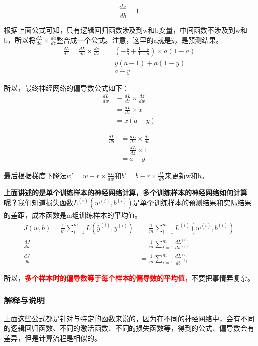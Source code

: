 \begin{equation}
	\frac{dz}{db} = 1 \label{eq:derivative_logistic_db}
\end{equation}

根据上面公式可知，只有逻辑回归函数涉及到w和b变量，中间函数不涉及到w和b，所以将$\frac{dL}{da} \times \frac{da}{dz}$整合成一个公式。注意，这里的a就是$\hat{y}$，是预测结果。
\begin{align*}
	\frac{dL}{dz} = \frac{dL}{da} \times \frac{da}{dz}  &= (-\frac{y}{a} + \frac{1 - y}{1 - a}) \times a(1 	- a) \\
	      																		&= y(a - 1) + a(1 - y) \\
	      																		&= a - y
\end{align*}

所以，最终神经网络的偏导数公式如下：
\begin{align*}
	\frac{dL}{dw} &= \frac{dL}{dz} \times \frac{dz}{dw} \\
						 &= \frac{dL}{dz} \times x \\
						 &= x(a-y)
\end{align*}

\begin{align*}
	\frac{dL}{db} &= \frac{dL}{dz} \times \frac{dz}{db} \\
						 &= \frac{dL}{dz} \times 1 \\
						 &= a-y
\end{align*}

最后根据梯度下降法$w' = w - r \times \frac{dL}{dw}$和$b' = b - r \times \frac{dL}{db}$来更新w和b。

\textbf{上面讲述的是单个训练样本的神经网络计算，多个训练样本的神经网络如何计算呢？}我们知道损失函数$L^{(i)}(w^{(i)},b^{(i)})$是单个训练样本的预测结果和实际结果的差距，成本函数是m组训练样本的平均值。
\begin{align*}
	J(w,b) = \frac{1}{m}\sum_{i=1}^{m}L(\hat{y}^{(i)}, y^{(i)}) &= \frac{1}{m}\sum_{i=1}^{m}L^{(i)}(w^{(i)},b^{(i)}) \\
	\frac{dJ}{dw} &= \frac{1}{m}\sum_{i=1}^{m}\frac{dL^{(i)}}{dw^{(i)}} \\
	\frac{dJ}{db} &= \frac{1}{m}\sum_{i=1}^{m}\frac{dL^{(i)}}{db^{(i)}}
\end{align*}

所以，\textcolor{red}{\textbf{多个样本时的偏导数等于每个样本的偏导数的平均值，}}不要把事情弄复杂。

\subsubsection{解释与说明}
上面这些公式都是针对与特定的函数来说的，因为在不同的神经网络中，会有不同的逻辑回归函数、不同的激活函数、不同的损失函数等，得到的公式、偏导数会有差异，但是计算流程是相似的。

